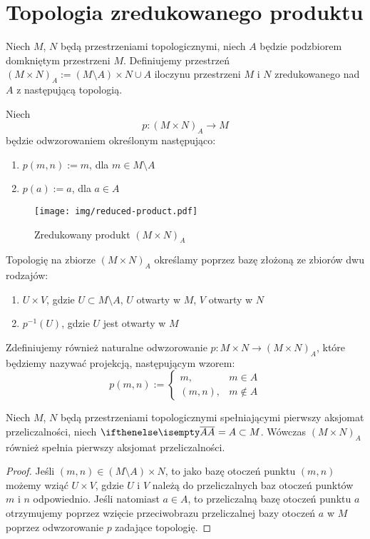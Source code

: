\section{Topologia zredukowanego produktu}
\begin{df}
  Niech $M$, $N$ będą przestrzeniami topologicznymi, niech $A$ będzie podzbiorem domkniętym przestrzeni $M$. Definiujemy przestrzeń $(M \times N)_A := (M \setminus A) \times N \cup A$ iloczynu przestrzeni $M$ i $N$ zredukowanego nad $A$ z następującą topologią.
  
  Niech
  \[
    p: (M \times N)_A \rightarrow M
  \]
  będzie odwzorowaniem określonym następująco:
  \begin{enumerate}
    \item $p(m, n) := m$, dla $m \in M \setminus A$
    \item $p(a) := a$, dla $a \in A$
  \end{enumerate}
  
  \begin{figure}[h!]
    \centering
    \texttt{[image: img/reduced-product.pdf]}
    \caption{Zredukowany produkt $(M\times N)_A$}
  \end{figure}
  
  Topologię na zbiorze $(M \times N)_A$ określamy poprzez bazę złożoną ze zbiorów dwu rodzajów:
  \begin{enumerate}
    \item $U \times V$, gdzie $U \subset M \setminus A$, $U$ otwarty w $M$, $V$ otwarty w $N$
    \item $p^{-1}(U)$, gdzie $U$ jest otwarty w $M$
  \end{enumerate}
  
  Zdefiniujemy również naturalne odwzorowanie $p: M\times N \to (M\times N)_A$, które będziemy nazywać projekcją, następującym wzorem:
  \[
    p(m,n) := \begin{cases}
      m,& m\in A \\
      (m,n),& m\not\in A
    \end{cases}
  \]
\end{df}

\begin{prop} \label{prop:reduced-prod-first-countable}
  Niech $M$, $N$ będą przestrzeniami topologicznymi spełniającymi pierwszy aksjomat przeliczalności, niech $\cl A = A \subset M$. Wówczas $(M\times N)_A$ również spełnia pierwszy aksjomat przeliczalności.
  \begin{proof}
    Jeśli $(m,n) \in (M\setminus A) \times N$, to jako bazę otoczeń punktu $(m,n)$ możemy wziąć $U\times V$, gdzie $U$ i $V$ należą do przeliczalnych baz otoczeń punktów $m$ i $n$ odpowiednio. Jeśli natomiast $a \in A$, to przeliczalną bazę otoczeń punktu $a$ otrzymujemy poprzez wzięcie przeciwobrazu przeliczalnej bazy otoczeń $a$ w $M$ poprzez odwzorowanie $p$ zadające topologię.
  \end{proof}
\end{prop}

